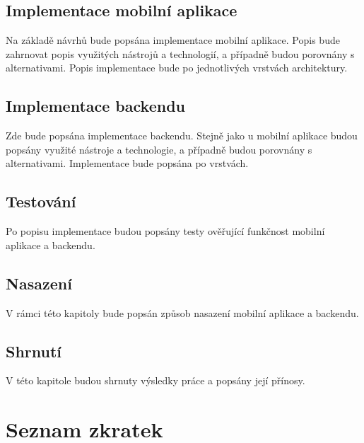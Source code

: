\documentclass[czech,master,unicode]{ctufit-thesis}
\theoremstyle{plain}
\theoremstyle{definition}
\theoremstyle{remark}
\numberwithin{theorem}{chapter}
\begin{document}
\begin{summarypage}
\section*{Implementace mobilní aplikace}
Na základě návrhů bude popsána implementace mobilní aplikace. Popis bude zahrnovat popis využitých nástrojů a technologií, a případně budou porovnány s alternativami. Popis implementace bude po jednotlivých vrstvách architektury.

\section*{Implementace backendu}
Zde bude popsána implementace backendu. Stejně jako u mobilní aplikace budou popsány využité nástroje a technologie, a případně budou porovnány s alternativami. Implementace bude popsána po vrstvách.

\section*{Testování}
Po popisu implementace budou popsány testy ověřující funkčnost mobilní aplikace a backendu.

\section*{Nasazení}
V rámci této kapitoly bude popsán způsob nasazení mobilní aplikace a backendu.

\section*{Shrnutí}
V této kapitole budou shrnuty výsledky práce \linebreak a popsány její přínosy.

\end{summarypage}

\chapter{Seznam zkratek}
	
\end{document}
